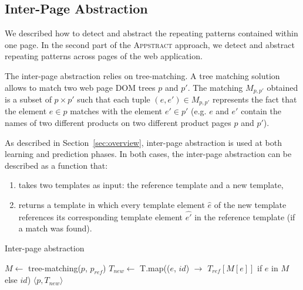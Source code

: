 

\subsection{Inter-Page Abstraction}\label{sec:inter}
We described how to detect and abstract the repeating patterns contained within one page. 
In the second part of the \textsc{Appstract} approach, we detect and abstract repeating patterns across pages of the web application.

The inter-page abstraction relies on tree-matching.
A tree matching solution allows to match two web page DOM trees $p$ and $p'$. 
The matching $M_{p, p'}$ obtained is a subset of  $p \times p'$ such that each tuple $(e, e') \in M_{p, p'}$ represents the fact that the element $e \in p$ matches with the element $e' \in p'$ (e.g. $e$ and $e'$ contain the names of two different products on two different product pages $p$ and $p'$).

As described in Section~\ref{sec:overview}, inter-page abstraction is used at both learning and prediction phases. In both cases, the inter-page abstraction can be described as a function that:
\begin{enumerate}
    \item takes two templates as input: the reference template and a new template,
    \item returns a template in which every template element $\hat{e}$ of the new template references its corresponding template element $\hat{e'}$ in the reference template (if a match was found).
\end{enumerate}

\begin{algorithm}
    \caption{Inter-page abstraction}\label{alg:inter-page}
    \begin{algorithmic}[1]
          \State $M \gets$ tree-matching($p$, $p_{ref}$)
          \State $T_{new} \gets$ T.map(($e$, $id$) $\to$ $T_{ref}[M[e]]$ if $e$ in $M$ else $id$)
          \State \Return $\langle p, T_{new} \rangle$
      \EndFunction
    \end{algorithmic}
\end{algorithm}

